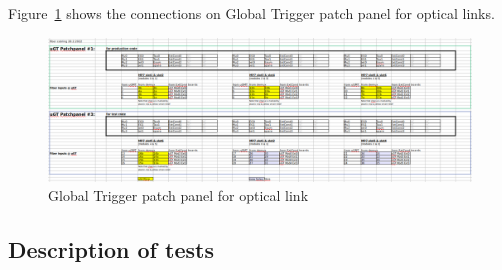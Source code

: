 Figure~\ref{fig:app:ugt_pp} shows the connections on Global Trigger patch panel for optical links.

\begin{figure}[htb]
\centering
\includegraphics[width=15cm]{figures/ugt_patchpanel}
\caption{Global Trigger patch panel for optical link}
\label{fig:app:ugt_pp}
\end{figure}

\subsection{Description of tests}\label{sec:app:app_e}

